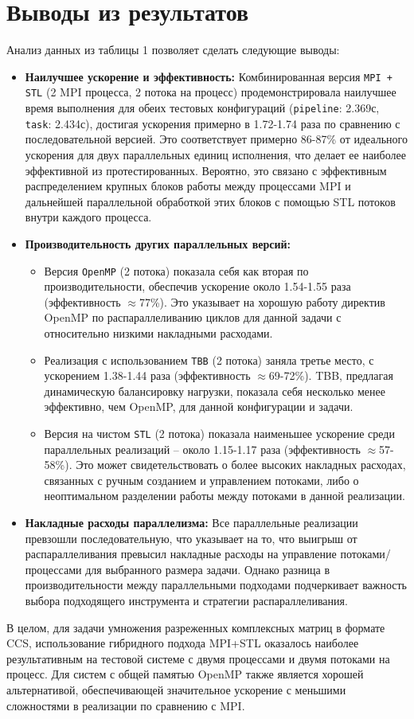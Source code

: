 \documentclass[12pt]{article}
\begin{document}
\section{Выводы из результатов}
Анализ данных из таблицы 1 позволяет сделать следующие выводы:

\begin{itemize}
    \item \textbf{Наилучшее ускорение и эффективность:} Комбинированная версия \texttt{MPI + STL} (2 MPI процесса, 2 потока на процесс) продемонстрировала наилучшее время выполнения для обеих тестовых конфигураций (\texttt{pipeline}: 2.369с, \texttt{task}: 2.434с), достигая ускорения примерно в 1.72-1.74 раза по сравнению с последовательной версией. Это соответствует примерно 86-87\% от идеального ускорения для двух параллельных единиц исполнения, что делает ее наиболее эффективной из протестированных. Вероятно, это связано с эффективным распределением крупных блоков работы между процессами MPI и дальнейшей параллельной обработкой этих блоков с помощью STL потоков внутри каждого процесса.
    \item \textbf{Производительность других параллельных версий:}
    \begin{itemize}
        \item Версия \texttt{OpenMP} (2 потока) показала себя как вторая по производительности, обеспечив ускорение около 1.54-1.55 раза (эффективность $\approx$77\%). Это указывает на хорошую работу директив OpenMP по распараллеливанию циклов для данной задачи с относительно низкими накладными расходами.
        \item Реализация с использованием \texttt{TBB} (2 потока) заняла третье место, с ускорением 1.38-1.44 раза (эффективность $\approx$69-72\%). TBB, предлагая динамическую балансировку нагрузки, показала себя несколько менее эффективно, чем OpenMP, для данной конфигурации и задачи.
        \item Версия на чистом \texttt{STL} (2 потока) показала наименьшее ускорение среди параллельных реализаций – около 1.15-1.17 раза (эффективность $\approx$57-58\%). Это может свидетельствовать о более высоких накладных расходах, связанных с ручным созданием и управлением потоками, либо о неоптимальном разделении работы между потоками в данной реализации.
    \end{itemize}
    \item \textbf{Накладные расходы параллелизма:} Все параллельные реализации превзошли последовательную, что указывает на то, что выигрыш от распараллеливания превысил накладные расходы на управление потоками/процессами для выбранного размера задачи. Однако разница в производительности между параллельными подходами подчеркивает важность выбора подходящего инструмента и стратегии распараллеливания.
\end{itemize}
В целом, для задачи умножения разреженных комплексных матриц в формате CCS, использование гибридного подхода MPI+STL оказалось наиболее результативным на тестовой системе с двумя процессами и двумя потоками на процесс. Для систем с общей памятью OpenMP также является хорошей альтернативой, обеспечивающей значительное ускорение с меньшими сложностями в реализации по сравнению с MPI.
\newpage
\end{document}
